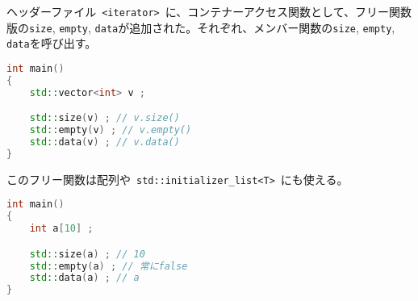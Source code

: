 %

ヘッダーファイル~\lstinline!<iterator>!~に、コンテナーアクセス関数として、フリー関数版の\lstinline!size!,
\lstinline!empty!,
\lstinline!data!が追加された。それぞれ、メンバー関数の\lstinline!size!,
\lstinline!empty!, \lstinline!data!を呼び出す。

\begin{lstlisting}[language=C++]
int main()
{
    std::vector<int> v ;

    std::size(v) ; // v.size()
    std::empty(v) ; // v.empty()
    std::data(v) ; // v.data() 
}
\end{lstlisting}

このフリー関数は配列や~\lstinline!std::initializer_list<T>!~にも使える。

\begin{lstlisting}[language=C++]
int main()
{
    int a[10] ;

    std::size(a) ; // 10
    std::empty(a) ; // 常にfalse
    std::data(a) ; // a
}
\end{lstlisting}

